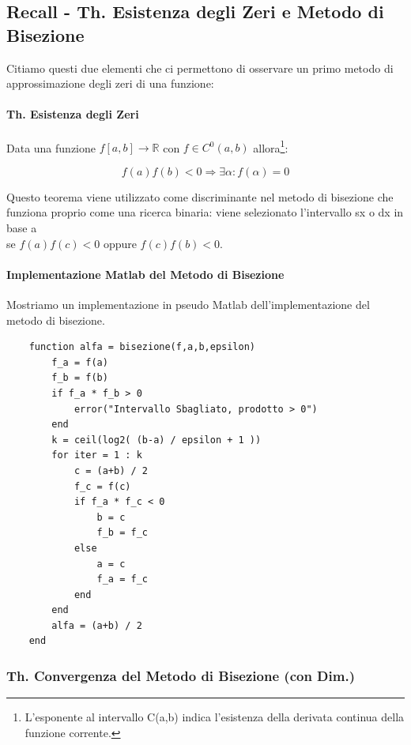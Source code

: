 \documentclass{article}
\begin{document}
\subsection{Recall - Th. Esistenza degli Zeri e Metodo di Bisezione}

Citiamo questi due elementi che ci permettono di osservare un primo metodo di approssimazione degli zeri di una funzione:

\paragraph{Th. Esistenza degli Zeri} Data una funzione $f[a,b] \rightarrow \mathbb{R}$ con $f \in C^{0}(a,b)$ allora\footnote{L'esponente al intervallo C(a,b) indica l'esistenza della derivata continua della funzione corrente.}:

\[ \boxed{f(a)f(b) < 0 \Rightarrow \exists \alpha : f(\alpha) = 0} \]

Questo teorema viene utilizzato come discriminante nel metodo di bisezione che funziona proprio come una ricerca binaria: viene selezionato l'intervallo sx o dx in base a \\ se $f(a)f(c) < 0$ oppure $f(c)f(b) < 0$.

\paragraph{Implementazione Matlab del Metodo di Bisezione} Mostriamo un implementazione in pseudo Matlab dell'implementazione del metodo di bisezione.

\vspace*{8px}

\begin{lstlisting}
    function alfa = bisezione(f,a,b,epsilon)
        f_a = f(a)
        f_b = f(b)
        if f_a * f_b > 0
            error("Intervallo Sbagliato, prodotto > 0")
        end
        k = ceil(log2( (b-a) / epsilon + 1 ))
        for iter = 1 : k
            c = (a+b) / 2
            f_c = f(c)
            if f_a * f_c < 0
                b = c
                f_b = f_c
            else
                a = c
                f_a = f_c
            end
        end
        alfa = (a+b) / 2
    end
\end{lstlisting}

\newpage

\subsubsection{Th. Convergenza del Metodo di Bisezione (con Dim.)}
\end{document}
